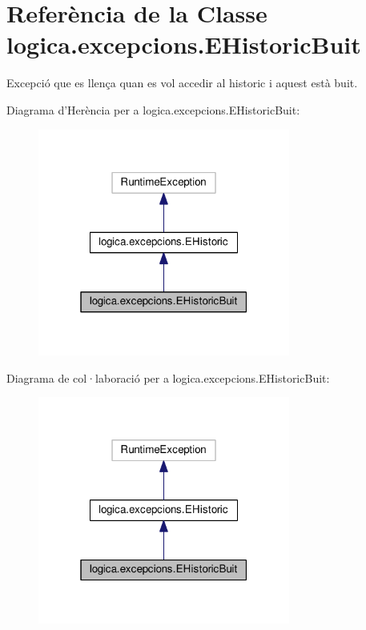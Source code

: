 \hypertarget{classlogica_1_1excepcions_1_1_e_historic_buit}{\section{Referència de la Classe logica.\+excepcions.\+E\+Historic\+Buit}
\label{classlogica_1_1excepcions_1_1_e_historic_buit}
}


Excepció que es llença quan es vol accedir al historic i aquest està buit.  




Diagrama d'Herència per a logica.\+excepcions.\+E\+Historic\+Buit\+:
\nopagebreak
\begin{figure}[H]
\begin{center}
\leavevmode
\includegraphics[width=235pt]{classlogica_1_1excepcions_1_1_e_historic_buit__inherit__graph}
\end{center}
\end{figure}


Diagrama de col·laboració per a logica.\+excepcions.\+E\+Historic\+Buit\+:
\nopagebreak
\begin{figure}[H]
\begin{center}
\leavevmode
\includegraphics[width=235pt]{classlogica_1_1excepcions_1_1_e_historic_buit__coll__graph}
\end{center}
\end{figure}

